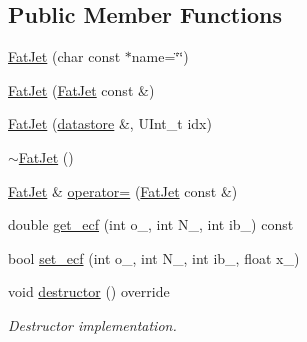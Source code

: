 \subsection*{Public Member Functions}
\begin{DoxyCompactItemize}
\item 
\hyperlink{classpanda_1_1FatJet_adeb3e4e2777a209439d038a353ec0ba6}{FatJet} (char const $\ast$name=\char`\"{}\char`\"{})
\item 
\hyperlink{classpanda_1_1FatJet_ab92df78ab1a2192c18c8d846966bf6d9}{FatJet} (\hyperlink{classpanda_1_1FatJet}{FatJet} const \&)
\item 
\hyperlink{classpanda_1_1FatJet_ad420844ffe922af3258fdae0a09c85d4}{FatJet} (\hyperlink{structpanda_1_1Element_1_1datastore}{datastore} \&, UInt\_\-t idx)
\item 
\hyperlink{classpanda_1_1FatJet_a268ffcd09f28943adc44a71ee61a7066}{$\sim$FatJet} ()
\item 
\hyperlink{classpanda_1_1FatJet}{FatJet} \& \hyperlink{classpanda_1_1FatJet_a20e4f6ca23c2a9a603c33e7f023337fe}{operator=} (\hyperlink{classpanda_1_1FatJet}{FatJet} const \&)
\item 
double \hyperlink{classpanda_1_1FatJet_ae0171384ac0c2ca7083aae114bf99bf8}{get\_\-ecf} (int o\_\-, int N\_\-, int ib\_\-) const 
\item 
bool \hyperlink{classpanda_1_1FatJet_a3ec88bad0a620bf747ee3d7a954754a1}{set\_\-ecf} (int o\_\-, int N\_\-, int ib\_\-, float x\_\-)
\item 
void \hyperlink{classpanda_1_1FatJet_a421049d4b4315facb5bda39746f1a38b}{destructor} () override
\begin{DoxyCompactList}\small\item\em Destructor implementation. \item\end{DoxyCompactList}\end{DoxyCompactItemize}

